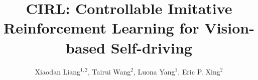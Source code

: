\documentclass[runningheads]{llncs}
\begin{document}
\pagestyle{headings}
\mainmatter
\def\ECCV18SubNumber{559}  %

\title{CIRL: Controllable Imitative Reinforcement Learning for Vision-based Self-driving} %





\author{Xiaodan Liang$^{1,2}$, Tairui Wang$^{2}$, Luona Yang$^{1}$, Eric P. Xing$^{2}$}




\maketitle
\end{document}

